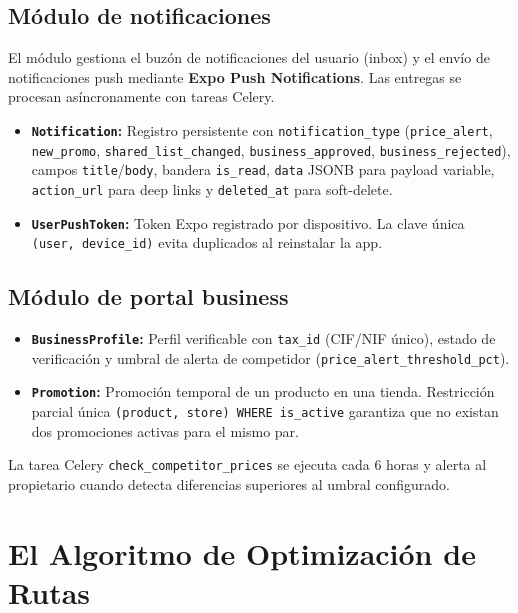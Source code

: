 \subsection{M\'odulo de notificaciones}\label{subsec:impl-notificaciones}

El m\'odulo gestiona el buz\'on de notificaciones del usuario (inbox) y el env\'io de
notificaciones push mediante \textbf{Expo Push Notifications}. Las entregas se procesan
as\'incronamente con tareas Celery.

\begin{itemize}
  \item \textbf{\texttt{Notification}:} Registro persistente con \texttt{notification\_type}
    (\texttt{price\_alert}, \texttt{new\_promo}, \texttt{shared\_list\_changed},
    \texttt{business\_approved}, \texttt{business\_rejected}), campos \texttt{title}/\texttt{body},
    bandera \texttt{is\_read}, \texttt{data} JSONB para payload variable, \texttt{action\_url}
    para deep links y \texttt{deleted\_at} para soft-delete.
  \item \textbf{\texttt{UserPushToken}:} Token Expo registrado por dispositivo. La clave \'unica
    \texttt{(user, device\_id)} evita duplicados al reinstalar la app.
\end{itemize}

\subsection{M\'odulo de portal business}\label{subsec:impl-business}

\begin{itemize}
  \item \textbf{\texttt{BusinessProfile}:} Perfil verificable con \texttt{tax\_id} (CIF/NIF
    \'unico), estado de verificaci\'on y umbral de alerta de competidor
    (\texttt{price\_alert\_threshold\_pct}).
  \item \textbf{\texttt{Promotion}:} Promoci\'on temporal de un producto en una tienda. Restricci\'on
    parcial \'unica \texttt{(product, store) WHERE is\_active} garantiza que no existan dos
    promociones activas para el mismo par.
\end{itemize}

La tarea Celery \texttt{check\_competitor\_prices} se ejecuta cada 6 horas y alerta al propietario
cuando detecta diferencias superiores al umbral configurado.

\section{El Algoritmo de Optimizaci\'on de Rutas}\label{sec:algoritmo}

